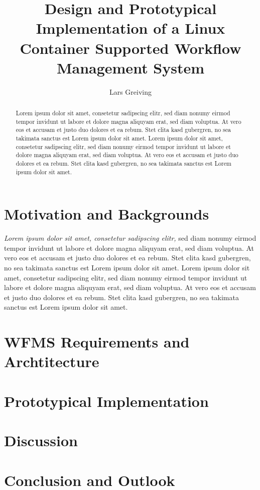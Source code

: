 \documentclass{article}
\title{Design and Prototypical Implementation of a Linux Container Supported Workflow Management System}
\author{Lars Greiving}
\begin{document}
  \maketitle
  \newpage
  \begin{abstract}
    Lorem ipsum dolor sit amet, consetetur sadipscing elitr, sed diam nonumy eirmod tempor invidunt ut labore et dolore magna aliquyam erat, sed diam voluptua. At vero eos et accusam et justo duo dolores et ea rebum. Stet clita kasd gubergren, no sea takimata sanctus est Lorem ipsum dolor sit amet. Lorem ipsum dolor sit amet, consetetur sadipscing elitr, sed diam nonumy eirmod tempor invidunt ut labore et dolore magna aliquyam erat, sed diam voluptua. At vero eos et accusam et justo duo dolores et ea rebum. Stet clita kasd gubergren, no sea takimata sanctus est Lorem ipsum dolor sit amet.
  \end{abstract}
  \tableofcontents
  \newpage

  \newpage
  \section{Motivation and Backgrounds} %
  \label{sec:motivation}
  
  \textit{Lorem ipsum dolor sit amet, consetetur sadipscing elitr,} sed diam nonumy eirmod tempor invidunt ut labore et dolore magna aliquyam erat, sed diam voluptua. At vero eos et accusam et justo duo dolores et ea rebum. 
  Stet clita kasd gubergren, no sea takimata sanctus est Lorem ipsum dolor sit amet. Lorem ipsum dolor sit amet, consetetur sadipscing elitr, sed diam nonumy eirmod tempor invidunt ut labore et dolore magna aliquyam erat, sed diam voluptua. At vero eos et accusam et justo duo dolores et ea rebum. Stet clita kasd gubergren, no sea takimata sanctus est Lorem ipsum dolor sit amet.


  \newpage
  \section{WFMS Requirements and Archtitecture} %
  \label{sec:wfms_requirements_and_archtitecture}
  

  \newpage
  \section{Prototypical Implementation} %
  \label{sec:prototypical_implementation}
  

  \newpage
  \section{Discussion} %
  \label{sec:discussion}
  

  \newpage
  \section{Conclusion and Outlook} %
  \label{sec:conclusion}
  
\end{document}
